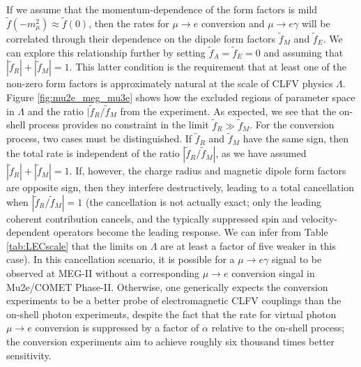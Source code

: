 \documentclass{book}[letterpaper,12pt]
\begin{document}
If we assume that the momentum-dependence of the form factors is mild $\tilde{f}(-m_{\mu}^2)\approx \tilde{f}(0)$, then the rates for $\mu\rightarrow e$ conversion and $\mu\rightarrow e\gamma$ will be correlated through their dependence on the dipole form factors $\tilde{f}_M$ and $\tilde{f}_E$. We can explore this relationship further by setting $\tilde{f}_A=\tilde{f}_E=0$ and assuming that $|\tilde{f}_R|+|\tilde{f}_M|=1$. This latter condition is the requirement that at least one of the non-zero form factors is approximately natural at the scale of CLFV physics $\Lambda$. Figure \ref{fig:mu2e_meg_mu3e} shows how the excluded regions of parameter space in $\Lambda$ and the ratio $|\tilde{f}_R/\tilde{f}_M$ from the experiment. As expected, we see that the on-shell process provides no constraint in the limit $\tilde{f}_R\gg \tilde{f}_M$. For the conversion process, two cases must be distinguished. If $\tilde{f}_R$ and $\tilde{f}_M$ have the same sign, then the total rate is independent of the ratio $|\tilde{f}_R/\tilde{f}_M|$, as we have assumed $|\tilde{f}_R|+|\tilde{f}_M|=1$. If, however, the charge radius and magnetic dipole form factors are opposite sign, then they interfere destructively, leading to a total cancellation when $|\tilde{f}_R/\tilde{f}_M|=1$ (the cancellation is not actually exact; only the leading coherent contribution cancels, and the typically suppressed spin and velocity-dependent operators become the leading response. We can infer from Table \ref{tab:LECscale} that the limits on $\Lambda$ are at least a factor of five weaker in this case). In this cancellation scenario, it is possible for a $\mu\rightarrow e\gamma$ signal to be observed at MEG-II without a corresponding $\mu\rightarrow e$ conversion singal in Mu2e/COMET Phase-II. Otherwise, one generically expects the conversion experiments to be a better probe of electromagnetic CLFV couplings than the on-shell photon experiments, despite the fact that the rate for virtual photon $\mu\rightarrow e$ conversion is suppressed by a factor of $\alpha$ relative to the on-shell process; the conversion experiments aim to achieve roughly six thousand times better sensitivity.
\end{document}
